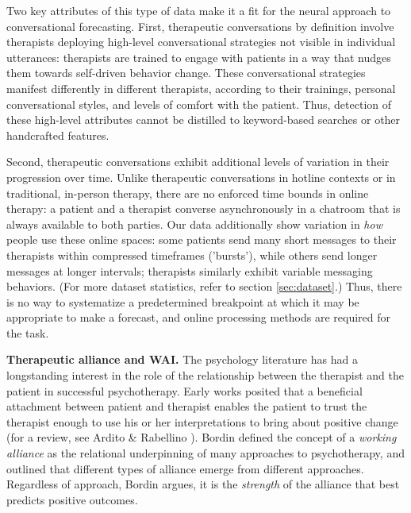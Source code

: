 \documentclass{article}
\newcommand{\fixme}[1]{\textcolor{red}{[FIXME: #1]}}
\begin{document}
Two key attributes of this type of data make it a fit for the neural approach to conversational forecasting. First, therapeutic conversations by definition involve therapists deploying high-level conversational strategies not visible in individual utterances: therapists are trained to engage with patients in a way that nudges them towards self-driven behavior change. These conversational strategies manifest differently in different therapists, according to their trainings, personal conversational styles, and levels of comfort with the patient. Thus, detection of these high-level attributes cannot be distilled to keyword-based searches or other handcrafted features.

Second, therapeutic conversations exhibit additional levels of variation in their progression over time. Unlike therapeutic conversations in hotline contexts \cite{althoff2016large} or in traditional, in-person therapy, there are no enforced time bounds in online therapy: a patient and a therapist converse asynchronously in a chatroom that is always available to both parties. Our data additionally show variation in \textit{how} people use these online spaces: some patients send many short messages to their therapists within compressed timeframes ('bursts'), while others send longer messages at longer intervals; therapists similarly exhibit variable messaging behaviors. (For more dataset statistics, refer to section \ref{sec:dataset}.) Thus, there is no way to systematize a predetermined breakpoint at which it may be appropriate to make a forecast, and online processing methods are required for the task.



\textbf{Therapeutic alliance and WAI.} The psychology literature has had a longstanding interest in the role of the relationship between the therapist and the patient in successful psychotherapy. Early works posited that a beneficial attachment between patient and therapist enables the patient to trust the therapist enough to use his or her interpretations to bring about positive change (for a review, see Ardito \& Rabellino \citeyear{ardito2011therapeutic}). Bordin \citeyear{bordin1979generalizability} defined the concept of a \textit{working alliance} as the relational underpinning of many approaches to psychotherapy, and outlined that different types of alliance emerge from different approaches. Regardless of approach, Bordin argues, it is the \textit{strength} of the alliance that best predicts positive outcomes.
\end{document}

